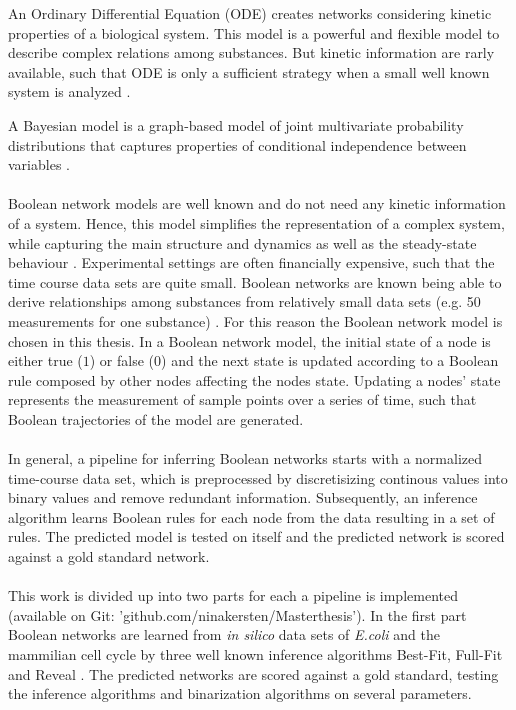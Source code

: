 An Ordinary Differential Equation (ODE) creates networks considering kinetic properties of a biological system. This model is a powerful and flexible model to describe complex relations among substances. But kinetic information are rarly available, such that ODE is only a sufficient strategy when a small well known system is analyzed \citep{Saadatpour.2013}.

A Bayesian model is a graph-based model of joint multivariate probability distributions that captures properties of conditional independence between variables \citep{Friedman.2000}.\\\\

Boolean network models are well known and do not need any kinetic information of a system. Hence, this model simplifies the representation of a complex system, while capturing the main structure and dynamics as well as the steady-state behaviour \citep{Berestovsky.2013}\citep{Saadatpour.2013}. Experimental settings are often financially expensive, such that the time course data sets are quite small. Boolean networks are known being able to derive relationships among substances from relatively small data sets (e.g. 50 measurements for one substance) \citep{Berestovsky.2013}. For this reason the Boolean network model is chosen in this thesis.
In a Boolean network model, the initial state of a node is either true ($1$) or false ($0$) and the next state is updated according to a Boolean rule  composed by other nodes affecting the nodes state. Updating a nodes' state represents the measurement of sample points over a series of time, such that Boolean trajectories of the model are generated.
\\\\
In general, a pipeline for inferring Boolean networks starts with a normalized time-course data set, which is preprocessed by discretisizing continous values into binary values and remove redundant information. Subsequently,  an inference algorithm learns Boolean rules for each node from the data resulting in a set of rules. The predicted model is tested on itself and the predicted network is scored against a gold standard network.  
\\\\
This work is divided up into two parts for each a pipeline is implemented (available on Git: 'github.com/ninakersten/Masterthesis'). In the first part Boolean networks are learned from \textit{in silico} data sets of \textit{E.coli} and the mammilian cell cycle by three well known inference algorithms Best-Fit, Full-Fit and Reveal \citep{Barman.2017}. The predicted networks are scored against a gold standard, testing the inference algorithms and binarization algorithms on several parameters. 
